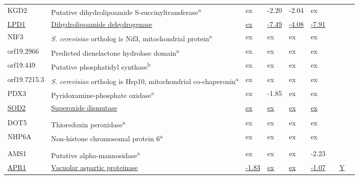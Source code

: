 \begin{ThreePartTable}
\begin{longtable}[t]{lllllllll}
\hspace{1em}KGD2 & Putative dihydrolipoamide S-succinyltransferase\textsuperscript{a} & ex & -2.20 & -2.04 & ex &  &  & \\
\hspace{1em}\underline{LPD1} & \underline{Dihydrolipoamide dehydrogenase} & \underline{ex} & \underline{-7.49} & \underline{-4.08} & \underline{-7.91} & \underline{} & \underline{} & \underline{}\\
\hspace{1em}NIF3 & \textit{S. cerevisiae} ortholog is Nif3, mitochondrial protein\textsuperscript{a} & ex & ex & ex & ex &  &  & \\
\hspace{1em}orf19.2966 & Predicted dienelactone hydrolase domain\textsuperscript{a} & ex & ex & ex & ex &  &  & \\
\hspace{1em}orf19.449 & Putative phosphatidyl synthase\textsuperscript{b} & ex & ex & ex & ex &  &  & \\
\hspace{1em}orf19.7215.3 & \textit{S. cerevisiae} ortholog is Hsp10, mitochondrial co-chaperonin\textsuperscript{a} & ex & ex & ex & ex &  &  & \\
\hspace{1em}PDX3 & Pyridoxamine-phosphate oxidase\textsuperscript{a} & ex & -1.85 & ex & ex &  &  & \\
\hspace{1em}\underline{SOD2} & \underline{Superoxide dismutase} & \underline{ex} & \underline{ex} & \underline{ex} & \underline{ex} & \underline{} & \underline{} & \underline{}\\
\addlinespace[0.3em]
\multicolumn{9}{l}{\textbf{Nucleus}}\\
\hspace{1em}DOT5 & Thioredoxin peroxidase\textsuperscript{a} & ex & ex & ex & ex &  &  & \\
\hspace{1em}NHP6A & Non-histone chromosomal protein 6\textsuperscript{a} & ex & ex & ex & ex &  &  & \\
\addlinespace[0.3em]
\multicolumn{9}{l}{\textbf{Vacuole}}\\
\hspace{1em}AMS1 & Putative alpha-mannosidase\textsuperscript{a} & ex & ex & ex & -2.23 &  &  & \\
\hspace{1em}\underline{APR1} & \underline{Vacuolar aspartic proteinase} & \underline{-1.83} & \underline{ex} & \underline{ex} & \underline{-1.07} & \underline{} & \underline{Y} & \underline{}\\

\end{longtable}
\end{ThreePartTable}
